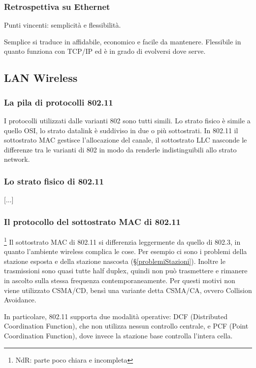 \subsubsection{Retrospettiva su Ethernet}
Punti vincenti: semplicità e flessibilità.

Semplice si traduce in affidabile, economico e facile da mantenere.
Flessibile in quanto funziona con TCP/IP ed è in grado di evolversi dove serve.

\subsection{LAN Wireless} %

\subsubsection{La pila di protocolli 802.11}
I protocolli utilizzati dalle varianti 802 sono tutti simili.
Lo strato fisico è simile a quello OSI, lo strato datalink è suddiviso in due o più sottostrati.
In 802.11 il sottostrato MAC gestisce l'allocazione del canale, il sottostrato LLC nasconde le differenze tra le varianti di 802 in modo da renderle indistinguibili allo strato network.

\subsubsection{Lo strato fisico di 802.11}
[...]

\subsubsection{Il protocollo del sottostrato MAC di 802.11}\footnote{NdR: parte poco chiara e incompleta}
Il sottostrato MAC di 802.11 si differenzia leggermente da quello di 802.3, in quanto l'ambiente wireless complica le cose.
Per esempio ci sono i problemi della stazione esposta e della stazione nascosta (§\ref{problemiStazioni}).
Inoltre le trasmissioni sono quasi tutte half duplex, quindi non può trasmettere e rimanere in ascolto sulla stessa frequenza contemporaneamente.
Per questi motivi non viene utilizzato CSMA/CD, bensì una variante detta CSMA/CA, ovvero Collision Avoidance.

In particolare, 802.11 supporta due modalità operative: 
DCF (Distributed Coordination Function), che non utilizza nessun controllo centrale,
e PCF (Point Coordination Function), dove invece la stazione base controlla l'intera cella.

